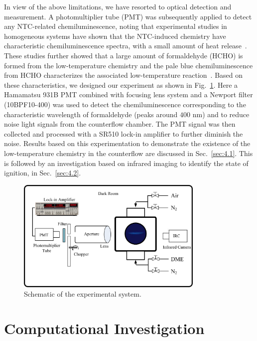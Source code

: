 \documentclass[review,3p,times]{elsarticleUS}
\begin{document}
In view of the above limitations, we have resorted to optical detection and measurement. A photomultiplier tube (PMT) was subsequently applied to detect any NTC-related chemiluminescence, noting that experimental studies in homogeneous systems have shown that the NTC-induced chemistry have characteristic chemiluminescence spectra, with a small amount of heat release~\cite{sheinson73,ohta91}.  These studies further showed that a large amount of formaldehyde (HCHO) is formed from the low-temperature chemistry and the pale blue chemiluminescence from HCHO characterizes the associated low-temperature reaction~\cite{gaydonbook}.  Based on these characteristics, we designed our experiment as shown in Fig.~\ref{fig:setup}. Here a Hamamatsu 931B PMT combined with focusing lens system and a Newport filter (10BPF10-400) was used to detect the chemiluminescence corresponding to the characteristic wavelength of formaldehyde (peaks around $400$ nm) and to reduce noise light signals from the counterflow chamber. The PMT signal was then collected and processed with a SR510 lock-in amplifier to further diminish the noise.  Results based on this experimentation to demonstrate the existence of the low-temperature chemistry in the counterflow are discussed in Sec.~\ref{sec:4.1}.  This is followed by an investigation based on infrared imaging to identify the state of ignition, in Sec.~\ref{sec:4.2}. 

\begin{figure}[t]
  \centering
  \scriptsize
  \includegraphics[width=0.8\textwidth]{Experimental_Setup.png}
  \normalsize
  \caption{Schematic of the experimental system.}
  \label{fig:setup}
\end{figure}

\section{Computational Investigation}
\end{document}
